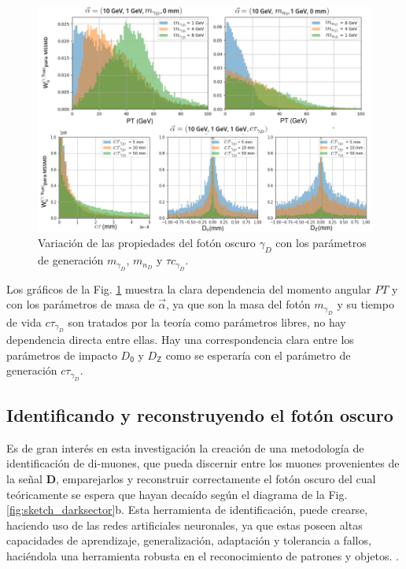\begin{figure}[!t]
\centering
\includegraphics[width=.9\textwidth]{Simulacion/imagenes/True_PT5.png}
\caption{Variación de las propiedades del fotón oscuro $\gamma_D$ con los parámetros de generación $m_{\gamma_D}$, $m_{n_D}$ y $\tau c_{\gamma_D}$.}
\label{PT_mu_True2}
\end{figure}

Los gráficos de la Fig. \ref{PT_mu_True2} muestra la clara dependencia del momento angular $PT$ y con los parámetros de masa de $\vec{\alpha}$, ya que son la masa del fotón $m_{\gamma_D}$ y su tiempo de vida $c\tau_{\gamma_D}$ son tratados por la teoría como parámetros libres, no hay dependencia directa entre ellas. Hay una correspondencia clara entre los parámetros de impacto $D_\textsf{0}$ y $D_\textsf{Z}$ como se esperaría con el parámetro de generación $c\tau_{\gamma_D}$.


\subsection{Identificando y reconstruyendo el fotón oscuro}

Es de gran interés en esta investigación la creación de una metodología de identificación de di-muones, que pueda discernir entre los muones provenientes de la señal \MSSM\textbf{D}, emparejarlos y reconstruir correctamente el fotón oscuro del cual teóricamente se espera que hayan decaído según el diagrama de la Fig. \ref{fig:sketch_darksector}b. Esta herramienta de identificación, puede crearse, haciendo uso de las redes artificiales neuronales, ya que estas poseen altas capacidades de aprendizaje, generalización, adaptación y tolerancia a fallos, haciéndola una herramienta robusta en el reconocimiento de patrones y objetos.     .

